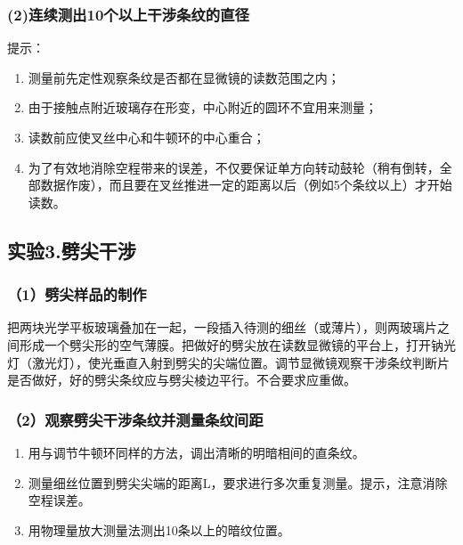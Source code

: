 \documentclass[11pt,a4paper,oneside]{article}
\begin{document}
\subsubsection*{(2)连续测出10个以上干涉条纹的直径}
提示：
\begin{enumerate}
	\item 测量前先定性观察条纹是否都在显微镜的读数范围之内；
	\item 由于接触点附近玻璃存在形变，中心附近的圆环不宜用来测量；
	\item 读数前应使叉丝中心和牛顿环的中心重合；
	\item 为了有效地消除空程带来的误差，不仅要保证单方向转动鼓轮（稍有倒转，全部数据作废），而且要在叉丝推进一定的距离以后（例如5个条纹以上）才开始读数。
\end{enumerate}

\subsection*{实验3.劈尖干涉}
\subsubsection*{（1）劈尖样品的制作}
把两块光学平板玻璃叠加在一起，一段插入待测的细丝（或薄片），则两玻璃片之间形成一个劈尖形的空气薄膜。把做好的劈尖放在读数显微镜的平台上，打开钠光灯（激光灯），使光垂直入射到劈尖的尖端位置。调节显微镜观察干涉条纹判断片是否做好，好的劈尖条纹应与劈尖棱边平行。不合要求应重做。
\subsubsection*{（2）观察劈尖干涉条纹并测量条纹间距}
\begin{enumerate}
	\item 用与调节牛顿环同样的方法，调出清晰的明暗相间的直条纹。
	\item 测量细丝位置到劈尖尖端的距离L，要求进行多次重复测量。提示，注意消除空程误差。
	\item 用物理量放大测量法测出10条以上的暗纹位置。
\end{enumerate}
\end{document}
